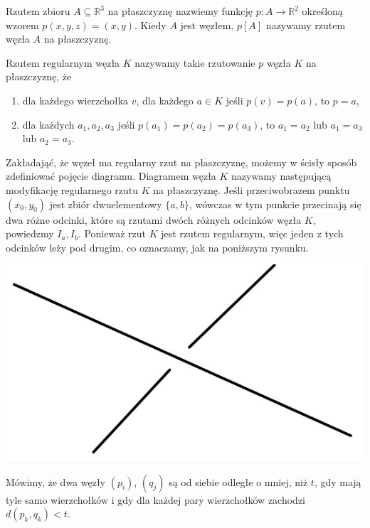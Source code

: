 \begin{definicja}
 Rzutem zbioru $A\subseteq\mathbb{R}^3$ na płaszczyznę nazwiemy funkcję $p\colon A\to\mathbb{R}^2$ określoną wzorem $p(x,y,z) = (x,y)$. Kiedy $A$ jest węzłem, $p[A]$ nazywamy 
 rzutem węzła $A$ na płaszczyznę.
\end{definicja}


\begin{definicja}
\label{rzut_reg}
 Rzutem regularnym węzła $K$ nazywamy takie rzutowanie $p$ węzła $K$ na płaszczyznę, że
 \begin{enumerate}
  \item dla każdego wierzchołka $v$, dla każdego $a\in K$ jeśli $p(v) = p(a)$, to $p=a$,
  \item dla każdych $a_1, a_2, a_3$ jeśli $p(a_1)=p(a_2)=p(a_3)$, to $a_1=a_2$ lub $a_1=a_3$ lub $a_2=a_3$.
 \end{enumerate}
\end{definicja}

Zakładająć, że węzeł ma regularny rzut na płaszczyznę, możemy w ścisły sposób zdefiniować pojęcie diagramu.
Diagramem węzła $K$ nazywamy następującą modyfikację regularnego rzutu $K$ na płaszczyznę. Jeśli przeciwobrazem punktu $(x_0, y_0)$ jest zbiór dwuelementowy 
$\lbrace a,b\rbrace$, wówczas w tym punkcie przecinają się dwa różne odcinki, które są rzutami dwóch różnych odcinków węzła $K$, powiedzmy $I_a, I_b$. 
Ponieważ rzut $K$ jest rzutem regularnym, więc jeden z tych odcinków leży pod drugim, co oznaczamy, jak na poniższym rysunku. \\


	\begin{center}

	\includegraphics[scale=0.4]{1/pictures/skrz.jpg}
	\end{center}


\begin{definicja}
 Mówimy, że dwa węzły $(p_i)$, $(q_j)$ są od siebie odległe o mniej, niż $t$, gdy mają tyle samo wierzchołków i gdy dla każdej pary wierzchołków zachodzi $d(p_k,q_k) < t$.
\end{definicja}

